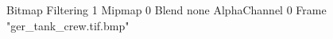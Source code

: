 {Bitmap
	{Filtering 1}
	{Mipmap 0}
	{Blend none}
	{AlphaChannel 0}
	{Frame "ger_tank_crew.tif.bmp"}
}
